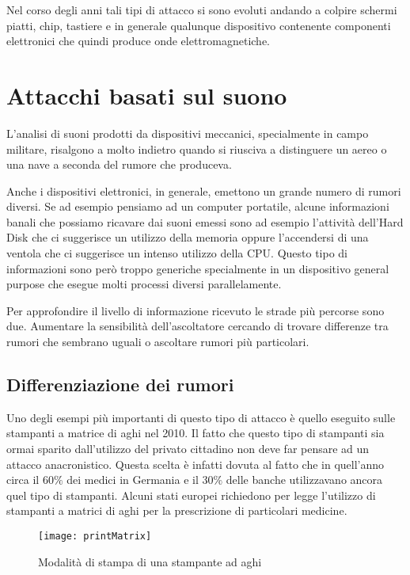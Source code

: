 		Nel corso degli anni tali tipi di attacco si sono evoluti andando a colpire schermi piatti\cite{kuhn2006eavesdropping}, chip\cite{martinasek2012simple}, tastiere\cite{vuagnoux2009compromising} e in generale qualunque dispositivo contenente componenti elettronici che quindi produce onde elettromagnetiche.
			
	\section{Attacchi basati sul suono}
		L'analisi di suoni prodotti da dispositivi meccanici, specialmente in campo militare, risalgono a molto indietro quando si riusciva a distinguere un aereo o una nave a seconda del rumore che produceva.
	
		Anche i dispositivi elettronici, in generale, emettono un grande numero di rumori diversi. Se ad esempio pensiamo ad un computer portatile, alcune informazioni banali che possiamo ricavare dai suoni emessi sono ad esempio l'attività dell'Hard Disk che ci suggerisce un utilizzo della memoria oppure l'accendersi di una ventola che ci suggerisce un intenso utilizzo della CPU. Questo tipo di informazioni sono però troppo generiche specialmente in un dispositivo general purpose che esegue molti processi diversi parallelamente.
	
		Per approfondire il livello di informazione ricevuto le strade più percorse sono due. Aumentare la sensibilità dell'ascoltatore cercando di trovare differenze tra rumori che sembrano uguali o ascoltare rumori più particolari.
	
		\subsection{Differenziazione dei rumori}	
			Uno degli esempi più importanti di questo tipo di attacco è quello eseguito sulle stampanti a matrice di aghi nel 2010\cite{backes2010acoustic}. Il fatto che questo tipo di stampanti sia ormai sparito dall'utilizzo del privato cittadino non deve far pensare ad un attacco anacronistico. Questa scelta è infatti dovuta al fatto che in quell'anno circa il $60\%$ dei medici in Germania e il $30\%$ delle banche utilizzavano ancora quel tipo di stampanti. Alcuni stati europei richiedono per legge l'utilizzo di stampanti a matrici di aghi per la prescrizione di particolari medicine\cite{bernatzky2011schmerzbehandlung}.
			
			\begin{figure}
				\begin{center}
					\texttt{[image: printMatrix]}
					\caption{Modalità di stampa di una stampante ad aghi}
					\label{fig:matrixHead}
				\end{center}
			\end{figure}
			

